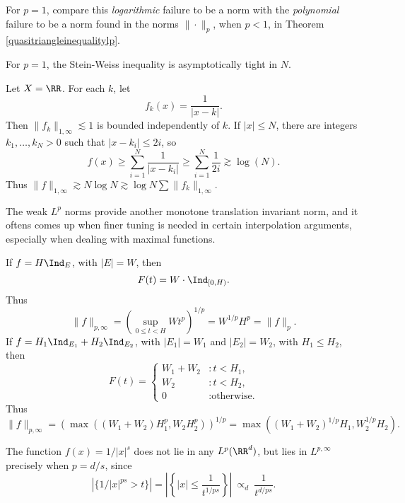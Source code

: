 \begin{remark}
  For $p = 1$, compare this \emph{logarithmic} failure to be a norm with the \emph{polynomial} failure to be a norm found in the norms $\| \cdot \|_p$, when $p < 1$, in Theorem \ref{quasitriangleinequalitylp}.
\end{remark}

For $p = 1$, the Stein-Weiss inequality is asymptotically tight in $N$.

\begin{example}
  Let $X = \RR$. For each $k$, let
  \[ f_k(x) = \frac{1}{|x - k|}. \]
  Then $\| f_k \|_{1,\infty} \lesssim 1$ is bounded independently of $k$. If $|x| \leq N$, there are integers $k_1, \dots, k_N > 0$ such that $|x - k_i| \leq 2i$, so
  \[ f(x) \geq \sum_{i = 1}^N \frac{1}{|x - k_i|} \geq \sum_{i = 1}^N \frac{1}{2i} \gtrsim \log(N). \]
  Thus $\| f \|_{1,\infty} \gtrsim N \log N \gtrsim \log N \sum \| f_k \|_{1,\infty}$.
\end{example}

The weak $L^p$ norms provide another monotone translation invariant norm, and it oftens comes up when finer tuning is needed in certain interpolation arguments, especially when dealing with maximal functions.

\begin{example}
  If $f = H \Ind_E$, with $|E| = W$, then
  \[ F(t) = W \cdot \Ind_{[0,H)}. \]
  Thus
  \[ \| f \|_{p,\infty} = \left( \sup_{0 \leq t < H} W t^p \right)^{1/p} = W^{1/p} H^p = \| f \|_p. \]
  If $f = H_1 \Ind_{E_1} + H_2 \Ind_{E_2}$, with $|E_1| = W_1$ and $|E_2| = W_2$, with $H_1 \leq H_2$, then
  \[ F(t) = \begin{cases} W_1 + W_2 &: t < H_1, \\ W_2 &: t < H_2, \\ 0 &: \text{otherwise.} \end{cases} \]
  Thus
  \[ \| f \|_{p,\infty} = \left( \max((W_1 + W_2) H_1^p, W_2 H_2^p) \right)^{1/p} = \max((W_1 + W_2)^{1/p} H_1, W_2^{1/p} H_2). \]
\end{example}

\begin{example}
    The function $f(x) = 1/|x|^s$ does not lie in any $L^p(\RR^d)$, but lies in $L^{p,\infty}$ precisely when $p = d/s$, since
    \[ \left| \{ 1/|x|^{ps} > t \} \right| = \left| \left\{ |x| \leq \frac{1}{t^{1/ps}} \right\} \right|\ \propto_d\ \frac{1}{t^{d/ps}}. \]
\end{example}

